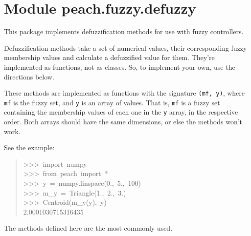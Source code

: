 %
%
%


\section{Module peach.fuzzy.defuzzy}

    \label{peach:fuzzy:defuzzy}

This package implements defuzzification methods for use with fuzzy controllers.

Defuzzification methods take a set of numerical values, their corresponding
fuzzy membership values and calculate a defuzzified value for them. They're
implemented as functions, not as classes. So, to implement your own, use the
directions below.

These methods are implemented as functions with the signature \texttt{(mf, y)}, where
\texttt{mf} is the fuzzy set, and \texttt{y} is an array of values. That is, \texttt{mf} is a
fuzzy set containing the membership values of each one in the \texttt{y} array, in
the respective order. Both arrays should have the same dimensions, or else the
methods won't work.

See the example:
\begin{quote}{\ttfamily \raggedright \noindent
>{}>{}>~import~numpy~\\
>{}>{}>~from~peach~import~*~\\
>{}>{}>~y~=~numpy.linspace(0.,~5.,~100)~\\
>{}>{}>~m{\_}y~=~Triangle(1.,~2.,~3.)~\\
>{}>{}>~Centroid(m{\_}y(y),~y)~\\
2.0001030715316435
}\end{quote}

The methods defined here are the most commonly used.


